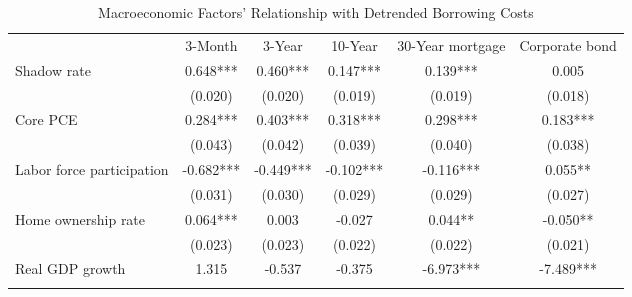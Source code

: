 \begin{table}[!h]
\caption{Macroeconomic Factors' Relationship with Detrended Borrowing Costs}
\centering
\begin{tabular}{llllll}
\cline{1-6}
\multicolumn{1}{c}{} &
  \multicolumn{1}{|c}{3-Month} &
  \multicolumn{1}{c}{3-Year} &
  \multicolumn{1}{c}{10-Year} &
  \multicolumn{1}{c}{30-Year mortgage} &
  \multicolumn{1}{c}{Corporate bond} \\
\cline{1-6}
\multicolumn{1}{l}{Shadow rate} &
  \multicolumn{1}{|c}{0.648***} &
  \multicolumn{1}{c}{0.460***} &
  \multicolumn{1}{c}{0.147***} &
  \multicolumn{1}{c}{0.139***} &
  \multicolumn{1}{c}{0.005} \\
\multicolumn{1}{l}{} &
  \multicolumn{1}{|c}{(0.020)} &
  \multicolumn{1}{c}{(0.020)} &
  \multicolumn{1}{c}{(0.019)} &
  \multicolumn{1}{c}{(0.019)} &
  \multicolumn{1}{c}{(0.018)} \\
\multicolumn{1}{l}{Core PCE} &
  \multicolumn{1}{|c}{0.284***} &
  \multicolumn{1}{c}{0.403***} &
  \multicolumn{1}{c}{0.318***} &
  \multicolumn{1}{c}{0.298***} &
  \multicolumn{1}{c}{0.183***} \\
\multicolumn{1}{l}{} &
  \multicolumn{1}{|c}{(0.043)} &
  \multicolumn{1}{c}{(0.042)} &
  \multicolumn{1}{c}{(0.039)} &
  \multicolumn{1}{c}{(0.040)} &
  \multicolumn{1}{c}{(0.038)} \\
\multicolumn{1}{l}{Labor force participation} &
  \multicolumn{1}{|c}{-0.682***} &
  \multicolumn{1}{c}{-0.449***} &
  \multicolumn{1}{c}{-0.102***} &
  \multicolumn{1}{c}{-0.116***} &
  \multicolumn{1}{c}{0.055**} \\
\multicolumn{1}{l}{} &
  \multicolumn{1}{|c}{(0.031)} &
  \multicolumn{1}{c}{(0.030)} &
  \multicolumn{1}{c}{(0.029)} &
  \multicolumn{1}{c}{(0.029)} &
  \multicolumn{1}{c}{(0.027)} \\
\multicolumn{1}{l}{Home ownership rate} &
  \multicolumn{1}{|c}{0.064***} &
  \multicolumn{1}{c}{0.003} &
  \multicolumn{1}{c}{-0.027} &
  \multicolumn{1}{c}{0.044**} &
  \multicolumn{1}{c}{-0.050**} \\
\multicolumn{1}{l}{} &
  \multicolumn{1}{|c}{(0.023)} &
  \multicolumn{1}{c}{(0.023)} &
  \multicolumn{1}{c}{(0.022)} &
  \multicolumn{1}{c}{(0.022)} &
  \multicolumn{1}{c}{(0.021)} \\
\multicolumn{1}{l}{Real GDP growth} &
  \multicolumn{1}{|c}{1.315} &
  \multicolumn{1}{c}{-0.537} &
  \multicolumn{1}{c}{-0.375} &
  \multicolumn{1}{c}{-6.973***} &
  \multicolumn{1}{c}{-7.489***} \\
\multicolumn{1}{l}{} &

\end{tabular}
\end{table}
